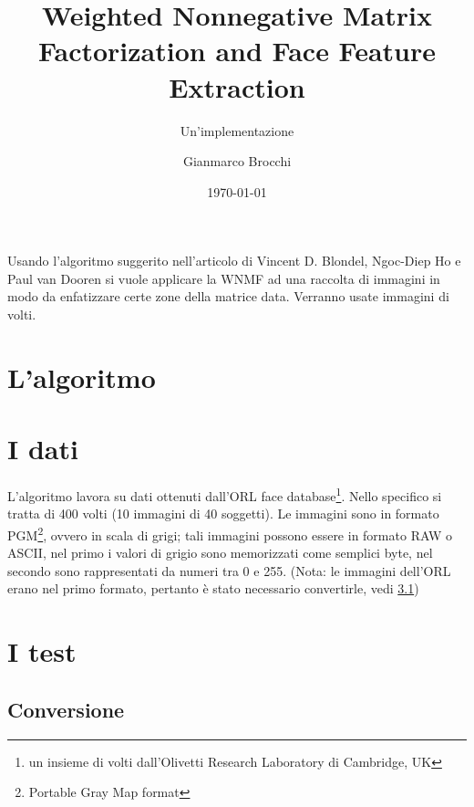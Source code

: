 \documentclass[a4paper]{scrartcl}
\author{Gianmarco Brocchi}
\title{Weighted Nonnegative Matrix Factorization
and Face Feature Extraction}
\subtitle{Un'implementazione}
\date{\today}
\begin{document}
\maketitle

Usando l'algoritmo suggerito nell'articolo di Vincent D. Blondel, Ngoc-Diep Ho e  Paul van Dooren si vuole applicare la WNMF ad una raccolta di immagini in modo da enfatizzare certe zone della matrice data. Verranno usate immagini di volti.

\section{L'algoritmo}
 
\section{I dati}
L'algoritmo lavora su dati ottenuti dall'ORL face database\footnote{un insieme di volti dall'Olivetti Research Laboratory di Cambridge, UK}.
Nello specifico si tratta di 400 volti (10 immagini di 40 soggetti). Le immagini sono in formato PGM\footnote{Portable Gray Map format}, ovvero in scala di grigi; tali immagini possono essere in formato RAW o ASCII, nel primo i valori di grigio sono memorizzati come semplici byte, nel secondo sono rappresentati da numeri tra 0 e 255. (Nota: le immagini dell'ORL erano nel primo formato, pertanto è stato necessario convertirle, vedi \ref{subsec:conversione})

\section{I test}
\subsection{Conversione}\label{subsec:conversione}
\end{document}
